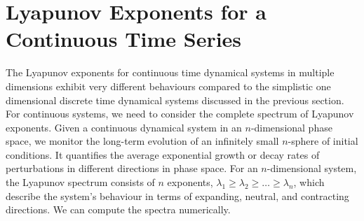 \section{Lyapunov Exponents for a Continuous Time Series}\label{LyapCts}

The Lyapunov exponents for continuous time dynamical systems in multiple dimensions exhibit very different behaviours compared to the simplistic one dimensional discrete time dynamical systems discussed in the previous section. 
For continuous systems, we need to consider the complete spectrum of Lyapunov exponents. 
Given a continuous dynamical system in an $n$-dimensional phase space, we monitor the long-term evolution of an infinitely small $n$-sphere of initial conditions. 
It quantifies the average exponential growth or decay rates of perturbations in different directions in phase space. 
For an $n$-dimensional system, the Lyapunov spectrum consists of $n$ exponents, $\lambda_1 \geq \lambda_2 \geq \dots \geq \lambda_n$, which describe the system's behaviour in terms of expanding, neutral, and contracting directions. We can compute the spectra numerically.

